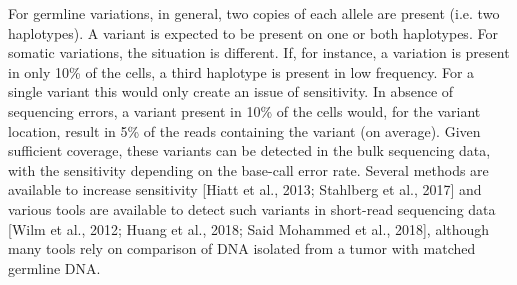For germline variations, in general, two copies of each allele are present (i.e. two haplotypes). 
A variant is expected to be present on one or both haplotypes. For somatic variations, the situation is different. 
If, for instance, a variation is present in only 10\% of the cells, a third haplotype is present in low frequency. 
For a single variant this would only create an issue of sensitivity. 
In absence of sequencing errors, a variant present in 10\% of the cells would, for the variant location, result in 5\% of the reads containing the variant (on average). 
Given sufficient coverage, these variants can be detected in the bulk sequencing data, with the sensitivity depending on the base-call error rate. 
Several methods are available to increase sensitivity [Hiatt et al., 2013; Stahlberg et al., 2017] and various tools are available to detect such variants in short-read sequencing data [Wilm et al., 2012; Huang et al., 2018; Said Mohammed et al., 2018], although many tools rely on comparison of DNA isolated from a tumor with matched germline DNA. 

